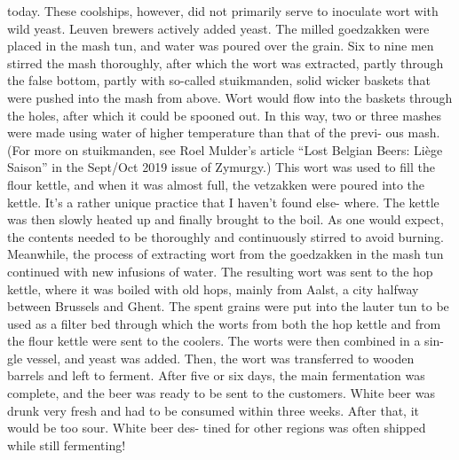 \documentclass[a4paper,parskip=half]{scrartcl}
\begin{document}
today. These coolships, however, did not
primarily serve to inoculate wort with wild
yeast. Leuven brewers actively added yeast.
The milled goedzakken were placed in
the mash tun, and water was poured over
the grain. Six to nine men stirred the
mash thoroughly, after which the wort was
extracted, partly through the false bottom,
partly with so-called stuikmanden, solid
wicker baskets that were pushed into the
mash from above. Wort would flow into
the baskets through the holes, after which
it could be spooned out. In this way, two
or three mashes were made using water of
higher temperature than that of the previ-
ous mash. (For more on stuikmanden, see
Roel Mulder’s article “Lost Belgian Beers:
Liège Saison” in the Sept/Oct 2019 issue
of Zymurgy.)
This wort was used to fill the flour kettle,
and when it was almost full, the vetzakken
were poured into the kettle. It’s a rather
unique practice that I haven’t found else-
where. The kettle was then slowly heated up
and finally brought to the boil. As one would
expect, the contents needed to be thoroughly
and continuously stirred to avoid burning.
Meanwhile, the process of extracting
wort from the goedzakken in the mash tun
continued with new infusions of water. The
resulting wort was sent to the hop kettle,
where it was boiled with old hops, mainly
from Aalst, a city halfway between Brussels
and Ghent. The spent grains were put into
the lauter tun to be used as a filter bed
through which the worts from both the
hop kettle and from the flour kettle were
sent to the coolers.
The worts were then combined in a sin-
gle vessel, and yeast was added. Then, the
wort was transferred to wooden barrels and
left to ferment. After five or six days, the
main fermentation was complete, and the
beer was ready to be sent to the customers.
White beer was drunk very fresh and had
to be consumed within three weeks. After
that, it would be too sour. White beer des-
tined for other regions was often shipped
while still fermenting!

\parencite[48]{Mulder2020}
\end{document}
